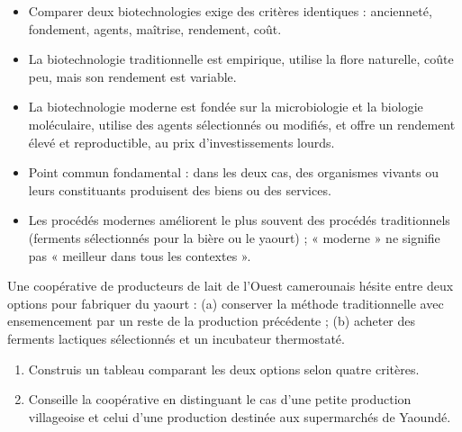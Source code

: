 \documentclass[11pt]{article}
\newcommand{\cle}[1]{{\popxbold\color{popdark}#1}}
\begin{document}
\begin{aretenir}
\begin{itemize}
\item Comparer deux biotechnologies exige des \cle{critères identiques} : ancienneté, fondement, agents, maîtrise, rendement, coût.
\item La biotechnologie traditionnelle est \cle{empirique}, utilise la flore naturelle, coûte peu, mais son rendement est variable.
\item La biotechnologie moderne est fondée sur la \cle{microbiologie et la biologie moléculaire}, utilise des agents sélectionnés ou modifiés, et offre un rendement élevé et reproductible, au prix d'investissements lourds.
\item Point commun fondamental : dans les deux cas, des \cle{organismes vivants ou leurs constituants} produisent des biens ou des services.
\item Les procédés modernes \cle{améliorent} le plus souvent des procédés traditionnels (ferments sélectionnés pour la bière ou le yaourt) ; « moderne » ne signifie pas « meilleur dans tous les contextes ».
\end{itemize}
\end{aretenir}

\begin{exercice}
Une coopérative de producteurs de lait de l'Ouest camerounais hésite entre deux options pour fabriquer du yaourt : (a) conserver la méthode traditionnelle avec ensemencement par un reste de la production précédente ; (b) acheter des ferments lactiques sélectionnés et un incubateur thermostaté.
\begin{enumerate}
\item Construis un tableau comparant les deux options selon quatre critères.
\item Conseille la coopérative en distinguant le cas d'une petite production villageoise et celui d'une production destinée aux supermarchés de Yaoundé.
\end{enumerate}
\end{exercice}
\end{document}
